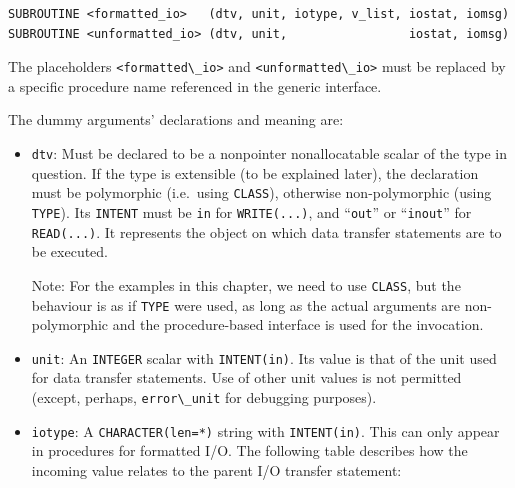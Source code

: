 \documentclass[
  paper=a4,
  ,captions=tableheading
]{scrartcl}
\newcommand{\passthrough}[1]{#1}
\begin{document}
\begin{lstlisting}
SUBROUTINE <formatted_io>   (dtv, unit, iotype, v_list, iostat, iomsg)
SUBROUTINE <unformatted_io> (dtv, unit,                 iostat, iomsg)
\end{lstlisting}

The placeholders \passthrough{\lstinline!<formatted\_io>!} and
\passthrough{\lstinline!<unformatted\_io>!} must be replaced by a
specific procedure name referenced in the generic interface.

The dummy arguments' declarations and meaning are:

\begin{itemize}
\item
  \passthrough{\lstinline!dtv!}: Must be declared to be a nonpointer
  nonallocatable scalar of the type in question. If the type is
  extensible (to be explained later), the declaration must be
  polymorphic (i.e.~using \passthrough{\lstinline!CLASS!}), otherwise
  non-polymorphic (using \passthrough{\lstinline!TYPE!}). Its
  \passthrough{\lstinline!INTENT!} must be \passthrough{\lstinline!in!}
  for \passthrough{\lstinline!WRITE(...)!}, and
  ``\passthrough{\lstinline!out!}'' or
  ``\passthrough{\lstinline!inout!}'' for
  \passthrough{\lstinline!READ(...)!}. It represents the object on which
  data transfer statements are to be executed.

  Note: For the examples in this chapter, we need to use
  \passthrough{\lstinline!CLASS!}, but the behaviour is as if
  \passthrough{\lstinline!TYPE!} were used, as long as the actual
  arguments are non-polymorphic and the procedure-based interface is
  used for the invocation.
\item
  \passthrough{\lstinline!unit!}: An \passthrough{\lstinline!INTEGER!}
  scalar with \passthrough{\lstinline!INTENT(in)!}. Its value is that of
  the unit used for data transfer statements. Use of other unit values
  is not permitted (except, perhaps,
  \passthrough{\lstinline!error\_unit!} for debugging purposes).
\item
  \passthrough{\lstinline!iotype!}: A
  \passthrough{\lstinline!CHARACTER(len=*)!} string with
  \passthrough{\lstinline!INTENT(in)!}. This can only appear in
  procedures for formatted I/O. The following table describes how the
  incoming value relates to the parent I/O transfer statement:
\end{itemize}
\end{document}
